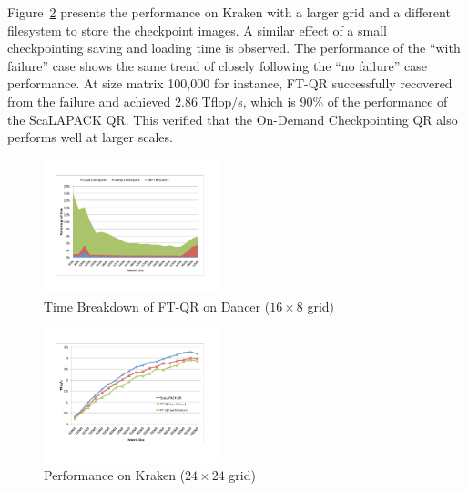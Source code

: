 Figure~\ref{fig:kraken_performance} presents the performance on Kraken
with a larger grid and a different filesystem to store the checkpoint
images. A similar effect of a small checkpointing saving and loading
time is observed. The performance of the ``with failure'' case shows
the same trend of closely following the ``no failure'' case
performance. At size matrix 100,000 for instance, FT-QR successfully recovered from
the failure and achieved 2.86 Tflop/s, which is 90\% of the
performance of the ScaLAPACK QR.  This verified that the On-Demand
Checkpointing QR also performs well at larger scales.

\begin{figure}[b]
	\centering
	\includegraphics[totalheight=0.25\textheight, width=0.45\textwidth,viewport=70 90 720 530, clip]{figures/dancer_1_error_timing_process_new}
	\caption{Time Breakdown of FT-QR on Dancer ($16\times 8$ grid)}
	\label{fig:dancer_timing}
\end{figure}

\begin{figure}[t]
	\centering
	\includegraphics[totalheight=0.25\textheight, width=0.45\textwidth,viewport=70 90 720 530, clip]{figures/kraken_new}
	\caption{Performance on Kraken ($24\times 24$ grid)}
	\label{fig:kraken_performance}
\end{figure}

